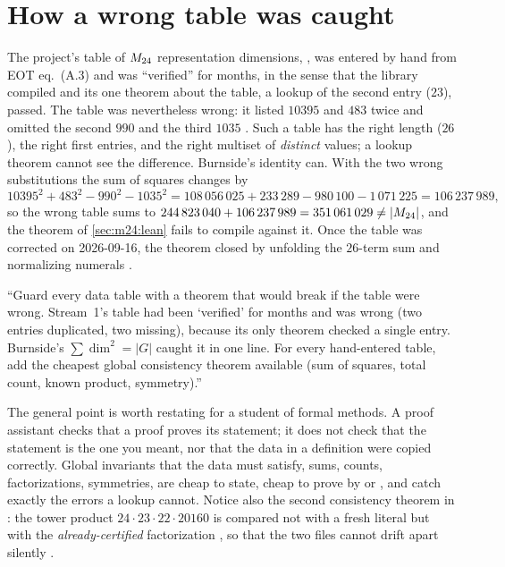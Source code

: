 \section{How a wrong table was caught}\label{sec:m24:story}

The project's table of $M_{24}$ representation dimensions, , was entered by
hand from EOT eq.~(A.3) and was ``verified'' for months, in the sense that the library
compiled and its one theorem about the table, a lookup of the second entry ($23$), passed.
The table was nevertheless wrong: it listed $10395$ and $483$ twice and omitted the second
$990$ and the third $1035$ .
Such a table has the right length ($26$), the right first entries, and the right multiset
of \emph{distinct} values; a lookup theorem cannot see the difference. Burnside's identity
can. With the two wrong substitutions the sum of squares changes by
\begin{equation}\label{eq:m24:wrongsum}
 10395^2+483^2-990^2-1035^2=108\,056\,025+233\,289-980\,100-1\,071\,225=106\,237\,989,
\end{equation}
so the wrong table sums to $244\,823\,040+106\,237\,989=351\,061\,029\ne|M_{24}|$, and the
theorem  of \cref{sec:m24:lean} fails to compile against it. Once
the table was corrected on 2026-09-16, the theorem closed by unfolding the $26$-term sum
and normalizing numerals .

\begin{historybox}
``Guard every data table with a theorem that would break if the table were wrong.
Stream~1's  table had been `verified' for months and was wrong (two entries
duplicated, two missing), because its only theorem checked a single entry. Burnside's
$\sum\dim^2=|G|$ caught it in one line. For every hand-entered table, add the cheapest
global consistency theorem available (sum of squares, total count, known product,
symmetry).'' 
\end{historybox}

The general point is worth restating for a student of formal methods. A proof assistant
checks that a proof proves its statement; it does not check that the statement is the one
you meant, nor that the data in a definition were copied correctly. Global invariants that
the data must satisfy, sums, counts, factorizations, symmetries, are cheap to state, cheap to
prove by  or , and catch exactly the errors a lookup cannot.
Notice also the second consistency theorem in : the tower product
$24\cdot23\cdot22\cdot20160$ is compared not with a fresh literal but with the
\emph{already-certified} factorization , so that the two files cannot drift
apart silently .

